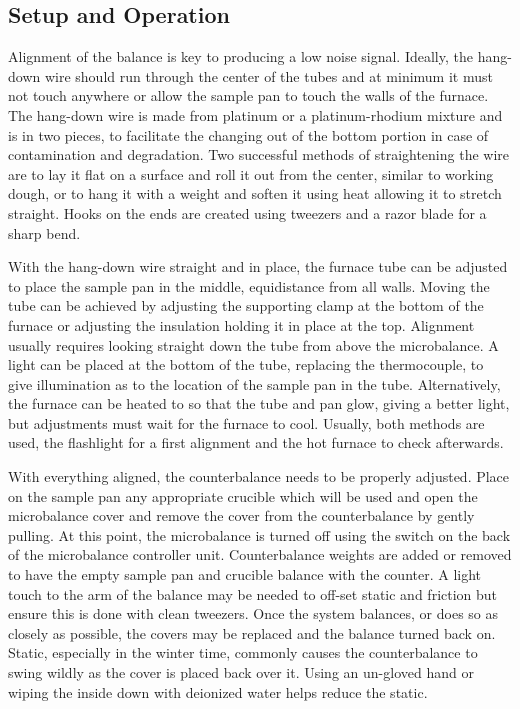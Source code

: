     \subsection{Setup and Operation}
        Alignment of the balance is key to producing a low noise signal.
        Ideally, the hang-down wire should run through the center of the tubes and at minimum it must not touch anywhere or allow the sample pan to touch the walls of the furnace.
        The hang-down wire is made from platinum or a platinum-rhodium mixture and is in two pieces, to facilitate the changing out of the bottom portion in case of contamination and degradation.
        Two successful methods of straightening the wire are to lay it flat on a surface and roll it out from the center, similar to working dough, or to hang it with a weight and soften it using heat allowing it to stretch straight.
        Hooks on the ends are created using tweezers and a razor blade for a sharp bend.

        With the hang-down wire straight and in place, the furnace tube can be adjusted to place the sample pan in the middle, equidistance from all walls.
        Moving the tube can be achieved by adjusting the supporting clamp at the bottom of the furnace or adjusting the insulation holding it in place at the top.
        Alignment usually requires looking straight down the tube from above the microbalance.
        A light can be placed at the bottom of the tube, replacing the thermocouple, to give illumination as to the location of the sample pan in the tube.
        Alternatively, the furnace can be heated to  so that the tube and pan glow, giving a better light, but adjustments must wait for the furnace to cool.
        Usually, both methods are used, the flashlight for a first alignment and the hot furnace to check afterwards.

        With everything aligned, the counterbalance needs to be properly adjusted.
        Place on the sample pan any appropriate crucible which will be used and open the microbalance cover and remove the cover from the counterbalance by gently pulling.
        At this point, the microbalance is turned off using the switch on the back of the microbalance controller unit.
        Counterbalance weights are added or removed to have the empty sample pan and crucible balance with the counter.
        A light touch to the arm of the balance may be needed to off-set static and friction but ensure this is done with clean tweezers.
        Once the system balances, or does so as closely as possible, the covers may be replaced and the balance turned back on.
        Static, especially in the winter time, commonly causes the counterbalance to swing wildly as the cover is placed back over it.
        Using an un-gloved hand or wiping the inside down with deionized water helps reduce the static.

